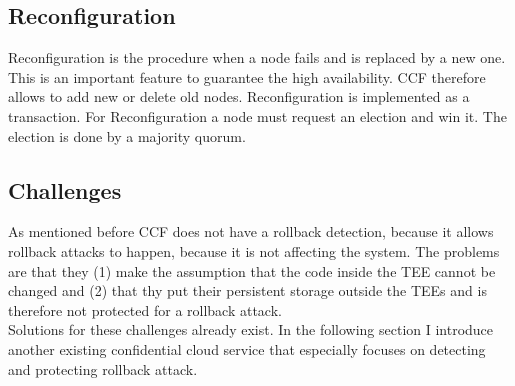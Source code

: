 \subsection{Reconfiguration}
Reconfiguration is the procedure when a node fails and is replaced by a new one. This is an important feature to guarantee the high availability. CCF therefore allows to add new or delete old nodes. Reconfiguration is implemented as a transaction. For Reconfiguration a node must request an election and win it. The election is done by a majority quorum. 
\subsection{Challenges}
\label{challenges:ccf}
As mentioned before CCF does not have a rollback detection, because it allows rollback attacks to happen, because it is not affecting the system. The problems are that they (1) make the assumption that the code inside the TEE cannot be changed and (2) that thy put their persistent storage outside the TEEs and is therefore not protected for a rollback attack.\\
Solutions for these challenges already exist. In the following section I introduce another existing confidential cloud service that especially focuses on detecting and protecting rollback attack. 
